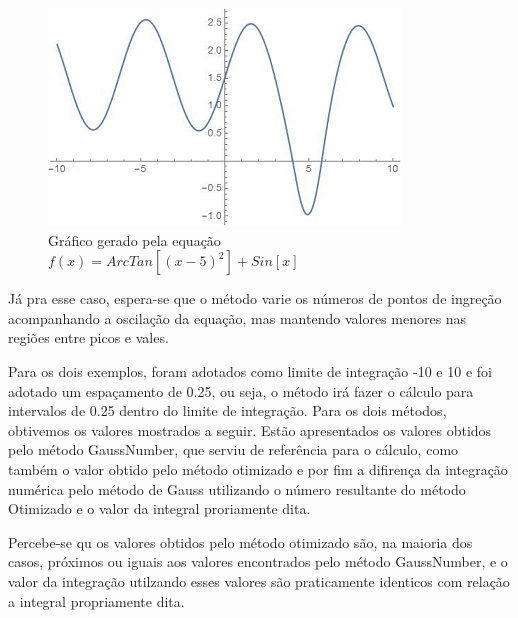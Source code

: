 \documentclass[12pt,a4paper]{article}
\begin{document}
\begin{figure}[h]
\begin{center}
\includegraphics{images/arctansingraph}
\caption{Gráfico gerado pela equação $f(x)=ArcTan[(x-5)^{2}]+Sin[x]$}
\end{center}
\end{figure}

Já pra esse caso, espera-se que o método varie os números de pontos de ingreção acompanhando a oscilação da equação, mas mantendo valores menores nas regiões entre picos e vales. 

Para os dois exemplos, foram adotados como limite de integração -10 e 10 e foi adotado um espaçamento de 0.25, ou seja, o método irá fazer o cálculo para intervalos de 0.25 dentro do limite de integração. Para os dois métodos, obtivemos os valores mostrados a seguir. Estão apresentados os valores obtidos pelo método GaussNumber, que serviu de referência para o cálculo, como também o valor obtido pelo método otimizado e por fim a difirença da integração numérica pelo método de Gauss utilizando o número resultante do método Otimizado e o valor da integral proriamente dita.

Percebe-se qu os valores obtidos pelo método otimizado são, na maioria dos casos, próximos ou iguais aos valores encontrados pelo método GaussNumber, e o valor da integração utilzando esses valores são praticamente identicos com relação a integral propriamente dita.

\newpage
\end{document}
